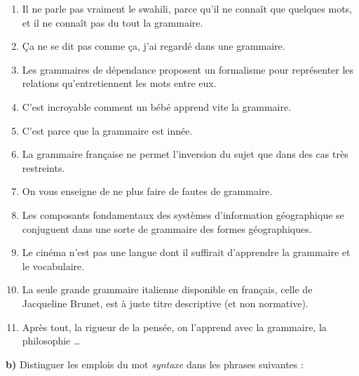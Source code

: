 {    \begin{enumerate}[label=(\arabic*)]
    \item  Il ne parle pas vraiment le swahili, parce qu’il ne connaît que quelques mots, et il ne connaît pas du tout la grammaire.
    \item  Ça ne se dit pas comme ça, j’ai regardé dans une grammaire.
    \item  Les grammaires de dépendance proposent un formalisme pour représenter les relations qu’entretiennent les mots entre eux.
    \item  C’est incroyable comment un bébé apprend vite la grammaire.
    \item  C’est parce que la grammaire est innée.
    \item  La grammaire française ne permet l’inversion du sujet que dans des cas très restreints.
    \item  On vous enseigne de ne plus faire de fautes de grammaire.
    \item  Les composants fondamentaux des systèmes d’information géographique se conjuguent dans une sorte de grammaire des formes géographiques.
    \item  Le cinéma n’est pas une langue dont il suffirait d’apprendre la grammaire et le vocabulaire.
    \item  La seule grande grammaire italienne disponible en français, celle de Jacqueline Brunet, est à juste titre descriptive (et non normative).
    \item  Après tout, la rigueur de la pensée, on l’apprend avec la grammaire, la philosophie …
    \end{enumerate}

    \textbf{b)} Distinguer les emplois du mot \textit{syntaxe} dans les phrases suivantes :

}
